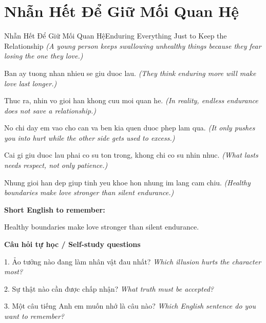 \section{Nhẫn Hết Để Giữ Mối Quan Hệ}
\begin{truyen}{Nhẫn Hết Để Giữ Mối Quan Hệ}{Enduring Everything Just to Keep the Relationship}
\textit{(A young person keeps swallowing unhealthy things because they fear losing the one they love.)}

Ban ay tuong nhan nhieu se giu duoc lau.
\textit{(They think enduring more will make love last longer.)}

Thuc ra, nhin vo gioi han khong cuu moi quan he.
\textit{(In reality, endless endurance does not save a relationship.)}

No chi day em vao cho can va ben kia quen duoc phep lam qua.
\textit{(It only pushes you into hurt while the other side gets used to excess.)}

Cai gi giu duoc lau phai co su ton trong, khong chi co su nhin nhuc.
\textit{(What lasts needs respect, not only patience.)}

\end{truyen}

\begin{baihoc}
Nhung gioi han dep giup tinh yeu khoe hon nhung im lang cam chiu.
\textit{(Healthy boundaries make love stronger than silent endurance.)}
\end{baihoc}

\begin{ghinhoanh}
\textbf{Short English to remember:}

Healthy boundaries make love stronger than silent endurance.

\end{ghinhoanh}

\begin{tuhocnhanh}
\textbf{Câu hỏi tự học / Self-study questions}

1. Ảo tưởng nào đang làm nhân vật đau nhất? \textit{Which illusion hurts the character most?}

2. Sự thật nào cần được chấp nhận? \textit{What truth must be accepted?}

3. Một câu tiếng Anh em muốn nhớ là câu nào? \textit{Which English sentence do you want to remember?}
\end{tuhocnhanh}
\ngancach

